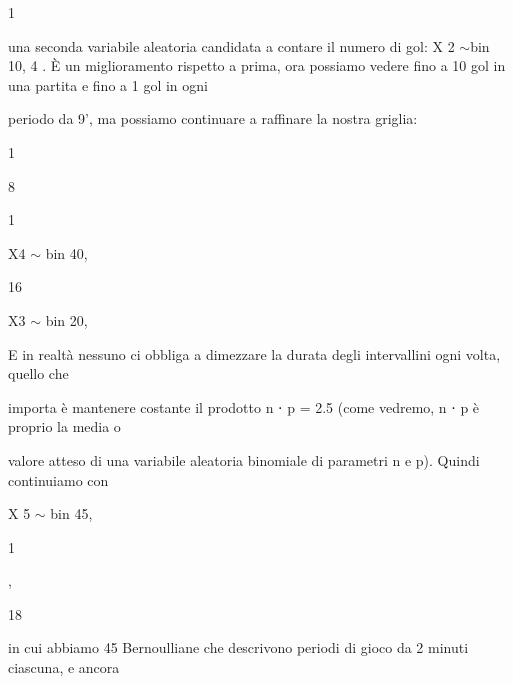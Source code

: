 \documentclass[a4paper,portrait,12pt]{article}
\begin{document}
1


\begin{flushleft}
una seconda variabile aleatoria candidata a contare il numero di gol: X 2 $\sim$bin 10, 4 . \`{E} un miglioramento rispetto a prima, ora possiamo vedere fino a 10 gol in una partita e fino a 1 gol in ogni
\end{flushleft}


\begin{flushleft}
periodo da 9', ma possiamo continuare a raffinare la nostra griglia:
\end{flushleft}


1


8


1


\begin{flushleft}
X4 $\sim$ bin 40,
\end{flushleft}


16


\begin{flushleft}
X3 $\sim$ bin 20,
\end{flushleft}





\begin{flushleft}
E in realt\`{a} nessuno ci obbliga a dimezzare la durata degli intervallini ogni volta, quello che
\end{flushleft}


\begin{flushleft}
importa \`{e} mantenere costante il prodotto n ⋅ p = 2.5 (come vedremo, n ⋅ p \`{e} proprio la media o
\end{flushleft}


\begin{flushleft}
valore atteso di una variabile aleatoria binomiale di parametri n e p). Quindi continuiamo con
\end{flushleft}


\begin{flushleft}
X 5 $\sim$ bin 45,
\end{flushleft}





1


,


18





\begin{flushleft}
in cui abbiamo 45 Bernoulliane che descrivono periodi di gioco da 2 minuti ciascuna, e ancora
\end{flushleft}
\end{document}
